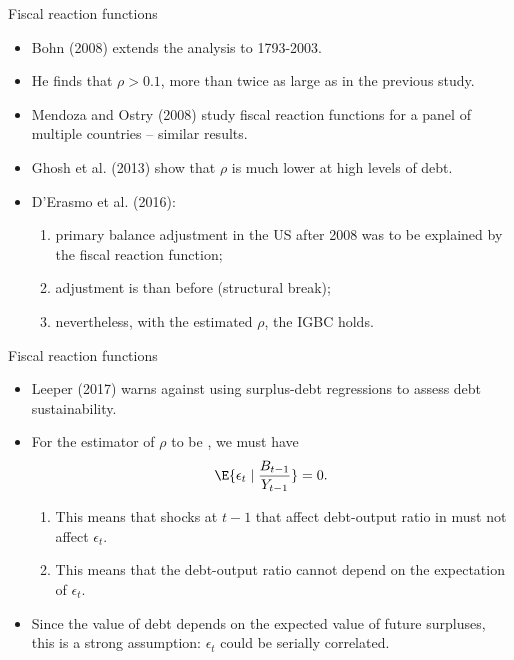 \documentclass[11pt,xcolor={dvipsnames},aspectratio=159,hyperref={pdftex,pdfpagemode=UseNone,hidelinks,pdfdisplaydoctitle=true},usepdftitle=false]{beamer}
\begin{document}
\begin{frame}{Fiscal reaction functions}
    \begin{itemize}
        \item Bohn (2008) extends the analysis to 1793-2003.
        \item He finds that $\rho>0.1$, more than twice as large as in the previous study.
        \item Mendoza and Ostry (2008) study fiscal reaction functions for a panel of multiple countries -- similar results.
        \item Ghosh et al. (2013) show that $\rho$ is much lower at high levels of debt. 
        \item D'Erasmo et al. (2016):
         \begin{enumerate}
            \item primary balance adjustment in the US after 2008 was  to be explained by the fiscal reaction function;
            \item adjustment is  than before (structural break);
            \item nevertheless, with the estimated $\rho$, the IGBC holds.
        \end{enumerate}
    \end{itemize}
\end{frame}

\begin{frame}{Fiscal reaction functions}
    \begin{itemize}
        \item Leeper (2017) warns against using surplus-debt regressions to assess debt sustainability.
        \item For the estimator of $\rho$ to be , we must have $$\E{\epsilon_t \mid \frac{B_{t-1}}{Y_{t-1}}} = 0.$$ \begin{enumerate}
            \item This means that shocks at $t-1$ that affect debt-output ratio in must not affect $\epsilon_t$.
            \item This means that the debt-output ratio cannot depend on the expectation of $\epsilon_t$.
        \end{enumerate}
        \item Since the value of debt depends on the expected value of future surpluses, this is a strong assumption: $\epsilon_t$ could be serially correlated.
    \end{itemize}
\end{frame}
\end{document}

